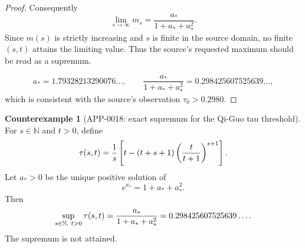 \documentclass[11pt]{article}
\numberwithin{equation}{section}
\theoremstyle{definition}
\newtheorem{counterexample}[theorem]{Counterexample}
\theoremstyle{remark}
\newcommand{\1}{\mathbf 1}
\begin{document}
\begin{proof}
Consequently
\[
\lim_{s\to\infty}m_s
=\frac{a_*}{1+a_*+a_*^2}.
\]
Since \(m(s)\) is strictly increasing and \(s\) is finite in the source domain, no finite \((s,t)\) attains the limiting value. Thus the source's requested maximum should be read as a supremum.

\[
a_*=1.79328213290076\ldots,\qquad
\frac{a_*}{1+a_*+a_*^2}=0.298425607525639\ldots,
\]
which is consistent with the source's observation \(\tau_0>0.2980\).
\end{proof}

\begin{counterexample}[APP-0018: exact supremum for the Qi-Guo tau threshold]
\label{thm:app18-qg-tau}
For \(s\in\mathbb N\) and \(t>0\), define
\[
  \tau(s,t)={1\over s}\left[t-(t+s+1)
        \left({t\over t+1}\right)^{s+1}\right].
\]
Let \(a_*>0\) be the unique positive solution of
\[
  e^{a_*}=1+a_*+a_*^2 .
\]
Then
\[
  \sup_{s\in\mathbb N,\ t>0}\tau(s,t)
   ={a_*\over 1+a_*+a_*^2}
   =0.298425607525639\ldots .
\]
The supremum is not attained.


\end{counterexample}
\end{document}
